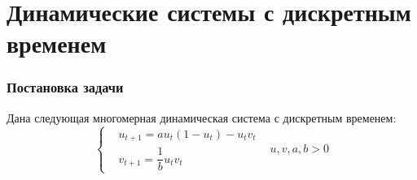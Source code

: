 \part{Динамические системы с дискретным временем}
\section{Постановка задачи}
Дана следующая многомерная динамическая система с дискретным временем:
\begin{equation}
    \left\{
    \begin{aligned}
        &u_{t+1} = au_t(1 - u_t) - u_tv_t&\\
        &v_{t+1} = \dfrac{1}{b}u_tv_t&
    \end{aligned}
    \right.u, v, a, b > 0
\end{equation}